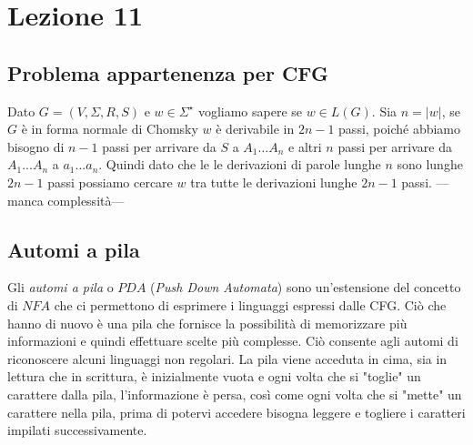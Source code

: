 
\section{Lezione 11}
\subsection{Problema appartenenza per CFG}
Dato $G = (V, \Sigma, R, S)$ e $w \in \Sigma^{\star}$ vogliamo sapere se $w \in L(G)$. Sia $n = |w|$, se $G$ è in forma normale di Chomsky $w$ è derivabile in $2n-1$ passi, poiché abbiamo bisogno di $n-1$ passi per arrivare da $S$ a $A_1 \dots A_n$ e altri $n$ passi per arrivare da $A_1 ... A_n$ a $a_1 ... a_n$. Quindi dato che le le derivazioni di parole lunghe $n$ sono lunghe $2n-1$ passi possiamo cercare $w$ tra tutte le derivazioni lunghe $2n-1$ passi. 
---manca complessità---
\subsection{Automi a pila}
Gli \textit{automi a pila} o $PDA$ (\textit{Push Down Automata}) sono un'estensione del concetto di $NFA$ che ci permettono di esprimere i linguaggi espressi dalle CFG. Ciò che hanno di nuovo è una pila che fornisce la possibilità di memorizzare più informazioni e quindi effettuare scelte più complesse. Ciò consente agli automi di riconoscere alcuni linguaggi non regolari. La pila viene acceduta in cima, sia in lettura che in scrittura, è inizialmente vuota e ogni volta che si "toglie" un carattere dalla pila, l'informazione è persa, così come ogni volta che si "mette" un carattere nella pila, prima di potervi accedere bisogna leggere e togliere i caratteri impilati successivamente.
